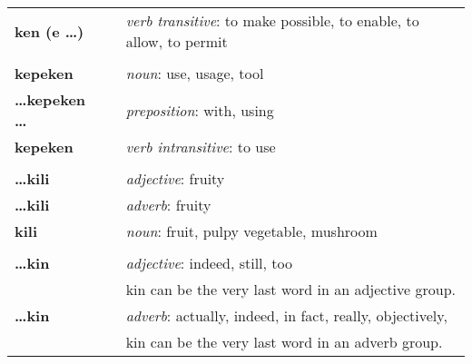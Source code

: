 \begin{supertabular}{p{2,5cm}|ll}
    \textbf{ken (e \dots)}       &  & \textit{verb transitive}: to make possible, to enable, to allow, to permit                                 \\
                                 &  &                                                                                                            \\ %
    \textbf{kepeken}             &  & \textit{noun}: use, usage, tool                                                                            \\
    \textbf{\dots kepeken \dots} &  & \textit{preposition}: with, using                                                                          \\
    \textbf{kepeken}             &  & \textit{verb intransitive}: to use                                                                         \\
                                 &  &                                                                                                            \\ %
    \textbf{\dots kili}          &  & \textit{adjective}: fruity                                                                                 \\
    \textbf{\dots kili}          &  & \textit{adverb}: fruity                                                                                    \\
    \textbf{kili}                &  & \textit{noun}: fruit, pulpy vegetable, mushroom                                                            \\
                                 &  &                                                                                                            \\ %
    \textbf{\dots kin}           &  & \textit{adjective}: indeed, still, too                                                                     \\ && kin can be the very last word in an adjective group. \\
    \textbf{\dots kin}           &  & \textit{adverb}: actually, indeed, in fact, really, objectively,                                           \\ && kin can be the very last word in an adverb group. \\

\end{supertabular}
